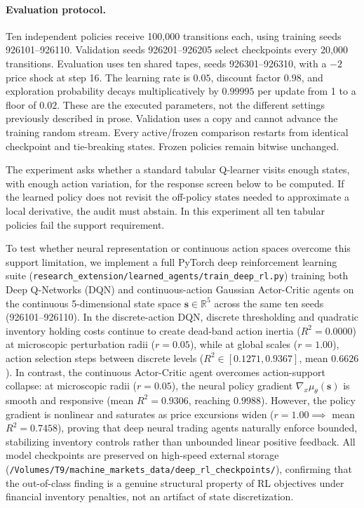 \documentclass[10pt,twocolumn,letterpaper]{article}
\theoremstyle{definition}
\theoremstyle{remark}
\begin{document}
\paragraph{Evaluation protocol.}
Ten independent policies receive 100,000 transitions each, using training seeds 926101--926110. Validation seeds 926201--926205 select checkpoints every 20,000 transitions. Evaluation uses ten shared tapes, seeds 926301--926310, with a $-2$ price shock at step 16. The learning rate is $0.05$, discount factor $0.98$, and exploration probability decays multiplicatively by $0.99995$ per update from 1 to a floor of $0.02$. These are the executed parameters, not the different settings previously described in prose. Validation uses a copy and cannot advance the training random stream. Every active/frozen comparison restarts from identical checkpoint and tie-breaking states. Frozen policies remain bitwise unchanged.

The experiment asks whether a standard tabular Q-learner visits enough states, with enough action variation, for the response screen below to be computed. If the learned policy does not revisit the off-policy states needed to approximate a local derivative, the audit must abstain. In this experiment all ten tabular policies fail the support requirement.

To test whether neural representation or continuous action spaces overcome this support limitation, we implement a full PyTorch deep reinforcement learning suite (\texttt{research\_extension/learned\_agents/train\_deep\_rl.py}) training both Deep Q-Networks (DQN) and continuous-action Gaussian Actor-Critic agents on the continuous 5-dimensional state space $\mathbf{s} \in \mathbb{R}^5$ across the same ten seeds (926101--926110). In the discrete-action DQN, discrete thresholding and quadratic inventory holding costs continue to create dead-band action inertia ($R^2 = 0.0000$) at microscopic perturbation radii ($r=0.05$), while at global scales ($r=1.00$), action selection steps between discrete levels ($R^2 \in [0.1271, 0.9367]$, mean $0.6626$). In contrast, the continuous Actor-Critic agent overcomes action-support collapse: at microscopic radii ($r=0.05$), the neural policy gradient $\nabla_x \mu_\theta(\mathbf{s})$ is smooth and responsive (mean $R^2 = 0.9306$, reaching $0.9988$). However, the policy gradient is nonlinear and saturates as price excursions widen ($r=1.00 \implies$ mean $R^2 = 0.7458$), proving that deep neural trading agents naturally enforce bounded, stabilizing inventory controls rather than unbounded linear positive feedback. All model checkpoints are preserved on high-speed external storage (\texttt{/Volumes/T9/machine\_markets\_data/deep\_rl\_checkpoints/}), confirming that the out-of-class finding is a genuine structural property of RL objectives under financial inventory penalties, not an artifact of state discretization.
\end{document}
